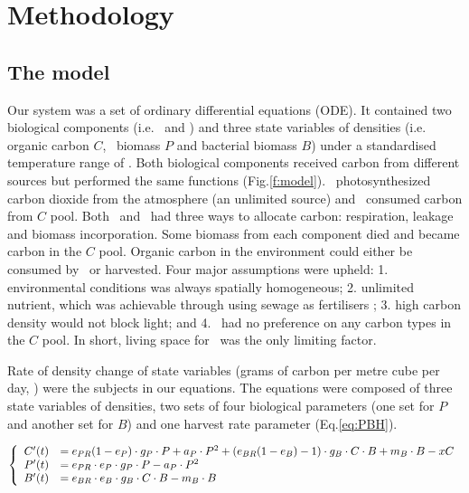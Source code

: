 \documentclass[../thesis.tex]{subfiles} %
\begin{document}
\section{Methodology}

\subsection{The model}

Our system was a set of ordinary differential equations (ODE).  It contained two biological components (i.e. \phy\ and \bac) and three state variables of densities (i.e. organic carbon $C$, \phy\ biomass $P$ and bacterial biomass $B$) under a standardised temperature range of \temp.  Both biological components received carbon from different sources but performed the same functions (Fig.\ref{f:model}). \Phy\ photosynthesized carbon dioxide from the atmosphere (an unlimited source) and \bac\ consumed carbon from $C$ pool.  Both \phy\ and \bac\ had three ways to allocate carbon: respiration, leakage and biomass incorporation. Some biomass from each component died and became carbon in the $C$ pool.  Organic carbon in the environment could either be consumed by \bac\ or harvested.  Four major assumptions were upheld: 1. environmental conditions was always spatially homogeneous; 2. unlimited nutrient, which was achievable through using sewage as fertilisers \autocite{markou2014microalgal}; 3. high carbon density would not block light; and 4. \bac\ had no preference on any carbon types in the $C$ pool.  In short, living space for \phy\ was the only limiting factor.

Rate of density change of state variables (grams of carbon per metre cube per day, \dxdt) were the subjects in our equations.  The equations were composed of three state variables of densities, two sets of four biological parameters (one set for $P$ and another set for $B$) and one harvest rate parameter (Eq.\ref{eq:PBH}).

\begin{equation}\left\{\begin{array}{rl}
    C'(t) &= e_{PR}(1-e_P)\cdot g_P\cdot P +a_P\cdot P^2 +(e_{BR}(1-e_B)-1)\cdot g_B\cdot C\cdot B +m_B\cdot B -xC\\
    P'(t) &= e_{PR}\cdot e_P\cdot g_P\cdot P -a_P\cdot P^2\\
    B'(t) &= e_{BR}\cdot e_B\cdot g_B\cdot C\cdot B -m_B\cdot B
\end{array}\right.\label{eq:PBH}\end{equation}
\end{document}
